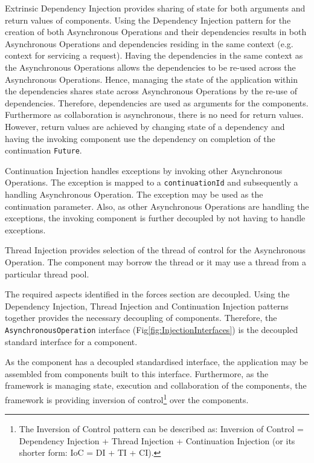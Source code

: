 \documentclass[prodmode]{style/acmlarge}
\begin{document}
Extrinsic Dependency Injection \cite{ioc} provides sharing of state for both
arguments and return values of components.  Using the Dependency Injection
pattern for the creation of both Asynchronous Operations and their dependencies
results in both Asynchronous Operations and dependencies residing in the same
context (e.g. context for servicing a request).  Having the dependencies in the
same context as the Asynchronous Operations allows the dependencies to be re-used
across the Asynchronous Operations.  Hence, managing the state of the
application within the dependencies shares state across Asynchronous Operations
by the re-use of dependencies.  Therefore, dependencies are used as arguments
for the components.  Furthermore as collaboration is asynchronous, there is no
need for return values.  However, return values are achieved by changing state
of a dependency and having the invoking component use the dependency on
completion of the continuation \texttt{Future}.

Continuation Injection handles exceptions by invoking other Asynchronous
Operations. The exception is mapped to a \texttt{continuationId} and
subsequently a handling Asynchronous Operation.  The exception may be used as
the continuation parameter.  Also, as other Asynchronous Operations are handling
the exceptions, the invoking component is further decoupled by not having to
handle exceptions.

Thread Injection provides selection of the thread of control for the
Asynchronous Operation.  The component may borrow the thread or it may use a
thread from a particular thread pool.

The required aspects identified in the forces section are decoupled.  Using
the Dependency Injection, Thread Injection and Continuation Injection patterns
together provides the necessary decoupling of components.  Therefore, the
\texttt{AsynchronousOperation} interface (Fig\ref{fig:InjectionInterfaces})
is the decoupled standard interface for a component.

As the component has a decoupled standardised interface, the application may be
assembled from components built to this interface.  Furthermore, as the
framework is managing state, execution and collaboration of the components, the
framework is providing inversion of control\footnote{The Inversion of Control
pattern can be described as: Inversion of Control = Dependency Injection +
Thread Injection + Continuation Injection (or its shorter form: IoC = DI + TI +
CI).} over the components.
\end{document}
